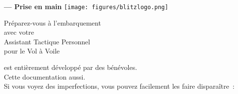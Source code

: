 \documentclass[french, a4paper, 12pt]{refrep}
\begin{document}
%
%
%
\thispagestyle{empty}
\begin{center}
\fontsize{34}{0}
\selectfont\textbf{\xc{} --- Prise en main}
\fontsize{12}{12}
\vspace{0.1em}
\texttt{[image: figures/blitzlogo.png]}

\vspace{1em}
{\Huge Préparez-vous à l'embarquement\\}
{\Large avec votre\\}
{\Huge Assistant Tactique Personnel\\pour le Vol à Voile\\}
\end{center}

\newpage

\begin{framed}
\begin{center}
	\xc{} est entièrement développé par des bénévoles.\\
	Cette documentation aussi.\\
	Si vous voyez des imperfections, vous pouvez facilement les faire disparaître~:\\

\end{center}
\end{framed}
\end{document}
